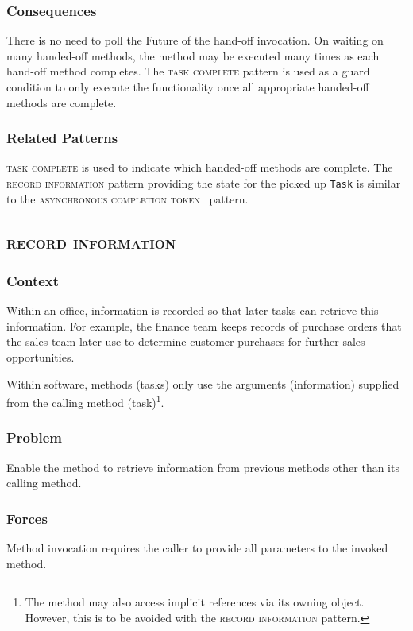 \documentclass[prodmode]{style/acmlarge}
\begin{document}
\subsubsection*{Consequences} There is no need to poll the Future of the
hand-off invocation.  On waiting on many handed-off methods, the method may be
executed many times as each hand-off method completes.  The \textsc{task
complete} pattern is used as a guard condition to only execute the functionality
once all appropriate handed-off methods are complete.

\subsubsection*{Related Patterns} \textsc{task complete} is used to indicate
which handed-off methods are complete.  The \textsc{record information} pattern
providing the state for the picked up \texttt{Task} is similar to the
\textsc{asynchronous completion token}~\cite{posa} pattern.



\subsection{\textsc{\textbf{record information}}}

\subsubsection*{Context} Within an office, information is recorded so that later
tasks can retrieve this information.  For example, the finance team keeps
records of purchase orders that the sales team later use to determine customer
purchases for further sales opportunities.

Within software, methods (tasks) only use the arguments (information) supplied
from the calling method (task)\footnote{The method may also access implicit
references via its owning object.  However, this is to be avoided with the
\textsc{record information} pattern.}.

\subsubsection*{Problem} Enable the method to retrieve information from previous
methods other than its calling method.

\subsubsection*{Forces} Method invocation requires the caller to provide all
parameters to the invoked method.
\end{document}
